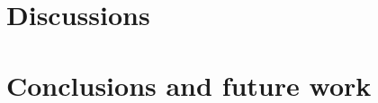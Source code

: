 \documentclass[11pt,a4paper]{report}
\begin{document}
\chapter{Discussions}

\chapter{Conclusions and future work}

\newpage
\printbibliography
\end{document}
